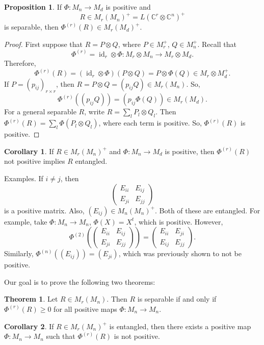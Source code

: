 \documentclass[12pt]{article}
\theoremstyle{definition}
\newtheorem*{theorem}{Theorem}
\newtheorem*{corollary}{Corollary}
\newtheorem*{proposition}{Proposition}
\newcommand{\C}{\mathbb{C}}
\begin{document}
\begin{proposition}
If $\Phi:M_n \to M_d$ is positive and
\[
R \in M_r(M_n)^+ = L(\C^r \otimes \C^n)^+
\]
is separable, then $\Phi^{(r)}(R) \in M_r(M_d)^+$.
\end{proposition}

\begin{proof}
First suppose that $R=P \otimes Q$, where $P \in M_r^+$, $Q \in M_n^+$. Recall that
\[
\Phi^{(r)} = \operatorname{id}_r \otimes \Phi : M_r \otimes M_n \to M_r \otimes M_d.
\]
Therefore,
\[
\Phi^{(r)}(R)=(\operatorname{id}_r \otimes \Phi)(P \otimes Q)=P \otimes \Phi(Q) \in M_r \otimes M_d^+.
\]
If $P=(p_{ij})_{r \times r}$, then $R=P \otimes Q=(p_{ij}Q) \in M_r(M_n)$. So,
\[
\Phi^{(r)}((p_{ij}Q))=(p_{ij}\Phi(Q)) \in M_r(M_d).
\]
For a general separable $R$, write $R=\sum_l P_l \otimes Q_l$. Then $\Phi^{(r)}(R)=\sum_l \Phi(P_l \otimes Q_l)$, where each term is positive. So, $\Phi^{(r)}(R)$ is positive.
\end{proof}

\begin{corollary}
If $R \in M_r(M_n)^+$ and $\Phi:M_n \to M_d$ is positive, then $\Phi^{(r)}(R)$ not positive implies $R$ entangled.
\end{corollary}

Examples. If $i \neq j$, then
\[
\begin{pmatrix}E_{ii} & E_{ij}\\ E_{ji} & E_{jj}\end{pmatrix}
\]
is a positive matrix. Also, $(E_{ij}) \in M_n(M_n)^+$. Both of these are entangled. For example, take $\Phi:M_n \to M_n$, $\Phi(X)=X^t$, which is positive. However,
\[
\Phi^{(2)}\left(\begin{pmatrix}E_{ii} & E_{ij}\\ E_{ji} & E_{jj}\end{pmatrix}\right)=\begin{pmatrix}E_{ii} & E_{ji}\\ E_{ij} & E_{jj}\end{pmatrix}.
\]
Similarly, $\Phi^{(n)}((E_{ij}))=(E_{ji})$, which was previously shown to not be positive.

Our goal is to prove the following two theorems:

\begin{theorem}
Let $R \in M_r(M_n)$. Then $R$ is separable if and only if $\Phi^{(r)}(R) \geq 0$ for all positive maps $\Phi:M_n \to M_n$.
\end{theorem}

\begin{corollary}
If $R \in M_r(M_n)^+$ is entangled, then there exists a positive map $\Phi:M_n \to M_n$ such that $\Phi^{(r)}(R)$ is not positive.
\end{corollary}
\end{document}
